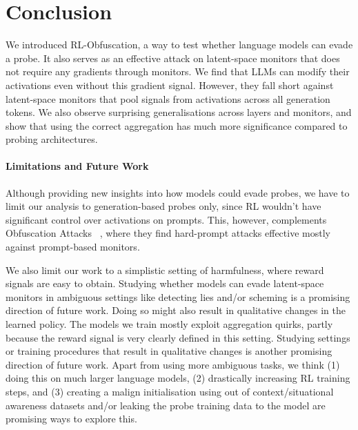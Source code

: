 \section{Conclusion}
\label{sec:conclusion}
We introduced RL-Obfuscation, a way to test whether language models can evade a probe. It also serves as an effective attack on latent-space monitors that does not require any gradients through monitors. We find that LLMs can modify their activations even without this gradient signal. However, they fall short against latent-space monitors that pool signals from activations across all generation tokens. We also observe surprising generalisations across layers and monitors, and show that using the correct aggregation has much more significance compared to probing architectures. 

\paragraph{Limitations and Future Work}
Although providing new insights into how models could evade probes, we have to limit our analysis to generation-based probes only, since RL wouldn't have significant control over activations on prompts. This, however, complements Obfuscation Attacks ~\citep{bailey2024obfuscated}, where they find hard-prompt attacks effective mostly against prompt-based monitors. 

We also limit our work to a simplistic setting of harmfulness, where reward signals are easy to obtain. Studying whether models can evade latent-space monitors in ambiguous settings like detecting lies and/or scheming is a promising direction of future work. Doing so might also result in qualitative changes in the learned policy. The models we train mostly exploit aggregation quirks, partly because the reward signal is very clearly defined in this setting. Studying settings or training procedures that result in qualitative changes is another promising direction of future work. Apart from using more ambiguous tasks, we think (1) doing this on much larger language models, (2) drastically increasing RL training steps, and (3) creating a malign initialisation using out of context/situational awareness datasets and/or leaking the probe training data to the model are promising ways to explore this.


